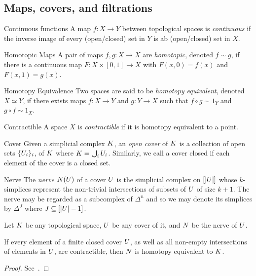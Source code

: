 \subsection{Maps, covers, and filtrations}
\begin{definition}{Continuous functions}
A map $f: X \rightarrow Y$ between topological spaces is \emph{continuous} if the inverse image of every (open/closed) set in $Y$ is ab (open/closed) set in $X$. 
\end{definition}
\begin{definition}{Homotopic Maps}
A pair of maps $f,g: X \rightarrow X$ are \emph{homotopic}, denoted $f \sim g$, if there is a continuous map $F: X \times [0,1] \rightarrow X$ with $F(x,0) = f(x)$ and $F(x,1) = g(x)$. 
\end{definition}
\begin{definition}{Homotopy Equivalence}
Two spaces are said to be \emph{homotopy equivalent}, denoted $X \simeq Y$, if there exists maps $f: X \rightarrow Y$ and $g: Y \rightarrow X$ such that $f \circ g \sim 1_Y$ and $g \circ f \sim 1_X$.
\end{definition}
\begin{definition}{Contractible}
A space $X$ is \emph{contractible} if it is homotopy equivalent to a point.
\end{definition}
\begin{definition}{Cover}
Given a simplicial complex $K$, an \emph{open cover} of $K$ is a collection of open sets $\{U_i\}_i$, of $K$ where $K = \bigcup_i U_i$. Similarly, we call a cover closed if each element of the cover is a closed set.
\end{definition}
\begin{definition}{Nerve}
The \emph{nerve} $N(U)$ of a cover $U$ is the simplicial complex on $[|U|]$ whose $k$-simplices represent the non-trivial intersections of subsets of $U$ of size $k+1$. The nerve may be regarded as a subcomplex of $\Delta^n$ and so we may denote its simplices by $\Delta^J$ where $J \subseteq [|U|-1]$.
\end{definition}
Let $K$ be any topological space, $U$ be any cover of it, and $N$ be the nerve of $U$. 
\begin{lemma}
If every element of a finite closed cover $U$, as well as all non-empty intersections of elements in $U$, are contractible, then $N$ is homotopy equivalent to $K$.
\end{lemma}
\begin{proof}
See~\cite{hatcher}.
\end{proof}
